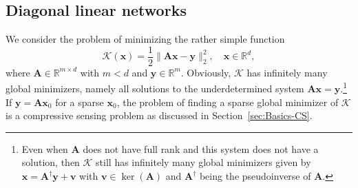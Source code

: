\documentclass{svproc}
\newcommand{\corr}[1]{#1}
\newcommand{\bA}{\boldsymbol{A}}
\newcommand{\bv}{\boldsymbol{v}}
\newcommand{\bx}{\boldsymbol{x}}
\newcommand{\by}{\boldsymbol{y}}
\newcommand{\0}{\boldsymbol{0}}
\newcommand{\1}{\boldsymbol{1}}
\def\R{\mathbb{R}}
\def\GD{\text{GD}}
\def\GF{\text{GF}}
\def\Lln{\mathcal{L}_\text{ln}}
\def\Ldln{\mathcal{L}_\text{dln}}
\begin{document}







\subsection{Diagonal linear networks}

We consider the problem of minimizing the rather simple function
\begin{equation}\label{def:ls}
\mathcal{K}(\bx) = \frac{1}{2} \|\bA \bx - \by\|_2^2, \quad \bx \in \R^d,
\end{equation}
where $\bA \in \R^{m \times d}$ with $m < d$ and 
$\by \in \corr{\R^m}$.  Obviously, $\mathcal{K}$ has infinitely many global \corr{minimizers}, namely all solutions to the underdetermined system $\bA \bx = \by$.\footnote{Even when $\bA$ does not have full rank and this system does not have a solution, then \corr{$\mathcal{K}$} still has infinitely many global minimizers given by $\bx = \bA^\dagger \by + \bv$ with $\bv \in \operatorname{ker}(\bA)$ and $\bA^\dagger$ being the \corr{pseudoinverse} of $\bA$.} If \corr{$\by = \bA \bx_0$} for a sparse $\bx_0$\corr{,} the problem of finding a sparse global minimizer of $\mathcal{K}$ is a compressive sensing problem as discussed in \corr{Section}~\ref{sec:Basics-CS}.
\end{document}
